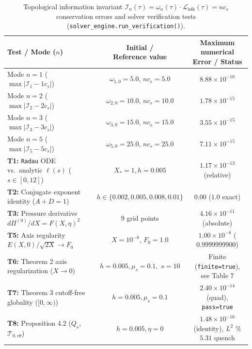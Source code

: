 \documentclass[12pt,a4paper]{article}
\begin{document}
\begin{table}[htbp]
\centering
\footnotesize
\setlength{\tabcolsep}{1pt}
\caption{Topological information invariant $\mathcal{I}_n(\tau) = \omega_n(\tau) \cdot \mathcal{L}_{\mathrm{isik}}(\tau) = n c_s$ conservation errors and solver verification tests (\texttt{solver\_engine.run\_verification()}).}
\vspace{0.15cm}
\begin{tabularx}{\textwidth}{@{}X|c|c@{}}
\hline
Test / Mode ($n$) & \shortstack{Initial / \\ Reference value} & \shortstack{Maximum numerical \\ Error / Status} \\
\hline
Mode $n = 1$ ($\max|\mathcal{I}_1 - 1 c_s|$) & $\omega_{1,0} = 5.0$, $n c_s = 5.0$ & $8.88 \times 10^{-16}$ \\
Mode $n = 2$ ($\max|\mathcal{I}_2 - 2 c_s|$) & $\omega_{2,0} = 10.0$, $n c_s = 10.0$ & $1.78 \times 10^{-15}$ \\
Mode $n = 3$ ($\max|\mathcal{I}_3 - 3 c_s|$) & $\omega_{3,0} = 15.0$, $n c_s = 15.0$ & $3.55 \times 10^{-15}$ \\
Mode $n = 5$ ($\max|\mathcal{I}_5 - 5 c_s|$) & $\omega_{5,0} = 25.0$, $n c_s = 25.0$ & $7.11 \times 10^{-15}$ \\
\hline
\textbf{T1:} \texttt{Radau} ODE vs.\ analytic $\ell(s)$ ($s \in [0, 12]$) & $X_*=1, h=0.005$ & $1.17 \times 10^{-13}$ (relative) \\
\textbf{T2:} Conjugate exponent identity ($A + D = 1$) & $h \in \{0.002, 0.005, 0.008, 0.01\}$ & $0.00$ ($1.0$ exact) \\
\textbf{T3:} Pressure derivative $d\Pi^{(0)}/dX = F(X,\eta)^2$ & 9 grid points & $4.16 \times 10^{-11}$ (absolute) \\
\textbf{T5:} Axis regularity $E(X,0)/\sqrt{2X} \to F_0$ & $X = 10^{-8}$, $F_0 = 1.0$ & $1.00 \times 10^{-8}$ ($0.9999999900$) \\
\textbf{T6:} Theorem 2 axis regularization ($X \to 0$) & \shortstack{$h=0.005, \mu_s=0.1,$ \\ $s=10$} & \shortstack{Finite (\texttt{finite=true}), \\ see Table 7} \\
\textbf{T7:} Theorem 3 cutoff-free globality ($[0,\infty)$) & $h=0.005, \mu_s=0.1$ & \shortstack{$2.40 \times 10^{-14}$ (quad), \\ \texttt{pass=true}} \\
\textbf{T8:} Proposition 4.2 ($Q_s$, $\mathcal{T}_{0,r\theta}$) & $h=0.005, \eta=0$ & \shortstack{$1.48 \times 10^{-16}$ (identity), \\ $L^2$ \%$5.31$ quench} \\

\end{tabularx}
\end{table}
\end{document}
